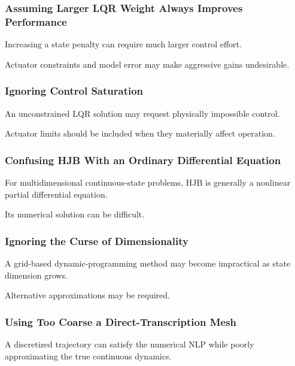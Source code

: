 \subsubsection{Assuming Larger LQR Weight Always Improves Performance}

Increasing a state penalty can require much larger control effort.

Actuator constraints and model error may make aggressive gains
undesirable.

\subsubsection{Ignoring Control Saturation}

An unconstrained LQR solution may request physically impossible control.

Actuator limits should be included when they materially affect operation.

\subsubsection{Confusing HJB With an Ordinary Differential Equation}

For multidimensional continuous-state problems, HJB is generally a
nonlinear partial differential equation.

Its numerical solution can be difficult.

\subsubsection{Ignoring the Curse of Dimensionality}

A grid-based dynamic-programming method may become impractical as state
dimension grows.

Alternative approximations may be required.

\subsubsection{Using Too Coarse a Direct-Transcription Mesh}

A discretized trajectory can satisfy the numerical NLP while poorly
approximating the true continuous dynamics.

